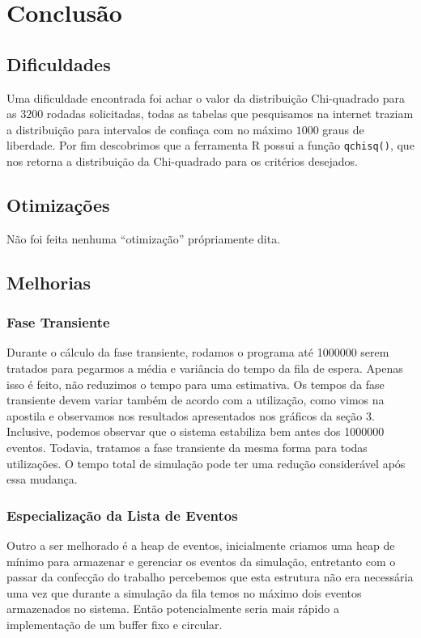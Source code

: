 \documentclass[a4paper]{article}
\newcommand{\inlcode}{\texttt}
\begin{document}
\newpage
\section{Conclusão}
\subsection{Dificuldades}
Uma dificuldade encontrada foi achar o valor da distribuição
Chi-quadrado para as \(3200\) rodadas solicitadas, todas as
tabelas que pesquisamos na internet traziam a distribuição
para intervalos de confiaça com no máximo \(1000\) graus de
liberdade. Por fim descobrimos que a ferramenta R possui
a função \inlcode{qchisq()},
que nos retorna a distribuição da Chi-quadrado
para os critérios desejados.

\subsection{Otimizações}
Não foi feita nenhuma ``otimização'' própriamente dita.

\subsection{Melhorias}
\subsubsection{Fase Transiente}
Durante o cálculo da fase transiente,
rodamos o programa até 1000000 serem tratados
para pegarmos a média e variância do tempo da fila de espera.
Apenas isso é feito,
não reduzimos o tempo para uma estimativa.
Os tempos da fase transiente devem variar também de acordo
com a utilização,
como vimos na apostila e
observamos nos resultados apresentados nos gráficos da seção 3.
Inclusive, podemos observar que o sistema estabiliza
bem antes dos 1000000 eventos.
Todavia, tratamos a fase transiente da mesma forma
para todas utilizações.
O tempo total de simulação pode ter
uma redução considerável após essa mudança.

\subsubsection{Especialização da Lista de Eventos}
Outro a ser melhorado é a heap de eventos,
inicialmente criamos uma heap de mínimo
para armazenar e gerenciar os eventos da simulação,
entretanto com o passar da confecção do trabalho
percebemos que esta estrutura não era necessária uma vez que
durante a simulação da fila temos no máximo dois eventos
armazenados no sistema.
Então potencialmente seria mais rápido
a implementação de um buffer fixo e circular.
\end{document}
